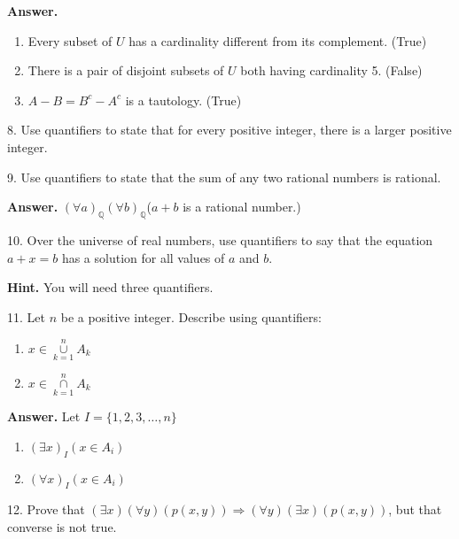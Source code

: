 \documentclass[10pt,]{book}
\theoremstyle{plain}
\theoremstyle{definition}
\theoremstyle{definition}
\theoremstyle{definition}
\theoremstyle{definition}
\begin{document}
\begin{exercisegroup}
%
\par\smallskip
\par\smallskip
\noindent\textbf{Answer.}\hypertarget{answer-26}{}\quad
\leavevmode%
\begin{enumerate}[label=\alph*]
\item\hypertarget{li-320}{} Every subset of \(U\) has a cardinality different from its complement. (True)%
\item\hypertarget{li-321}{} There is a pair of disjoint subsets of \(U\) both having cardinality 5. (False)%
\item\hypertarget{li-322}{}\(A-B=B^c-A^c\) is a tautology. (True) %
\end{enumerate}
%
\item[8.]\hypertarget{exercise-59}{}Use quantifiers to state that for every positive integer, there is a larger positive integer.
%
\par\smallskip
\item[9.]\hypertarget{exercise-60}{}Use  quantifiers to state that the sum of any two rational numbers is rational.
%
\par\smallskip
\par\smallskip
\noindent\textbf{Answer.}\hypertarget{answer-27}{}\quad
  \((\forall a)_{\mathbb{Q}}(\forall b)_{\mathbb{Q}}\)(\(a+b\) is a rational number.)%
\item[10.]\hypertarget{exercise-61}{}Over the universe of real numbers, use quantifiers to say that the equation \(a + x = b\) has a solution for all values of \(a\) and \(b\). 
%
\par\smallskip
\par\smallskip
\noindent\textbf{Hint.}\hypertarget{hint-4}{}\quad
You will need three quantifiers.%
\item[11.]\hypertarget{exercise-62}{}Let \(n\) be a positive integer.  Describe using quantifiers:%
\par
\leavevmode%
\begin{enumerate}[label=\alph*]
\item\hypertarget{li-323}{} \(x \in \underset{k=1}{\overset{n}{\cup }}A_k\)%
\item\hypertarget{li-324}{} \(x \in \underset{k=1}{\overset{n}{\cap }}A_k\)%
\end{enumerate}
%
\par\smallskip
\par\smallskip
\noindent\textbf{Answer.}\hypertarget{answer-28}{}\quad
Let \(I=\{1,2,3,\ldots ,n\}\)%
\par
\leavevmode%
\begin{enumerate}[label=\alph*]
\item\hypertarget{li-325}{} \((\exists x)_I\left(x\in A_i\right)\)%
\item\hypertarget{li-326}{}\((\forall x)_I\left(x\in A_i\right)\)%
\end{enumerate}
%
\item[12.]\hypertarget{exercise-63}{} Prove that \((\exists x)(\forall y)(p(x, y)) \Rightarrow  (\forall y)(\exists x)(p(x, y))\), but that converse is not true.
%
\par\smallskip
\end{exercisegroup}
\end{document}
